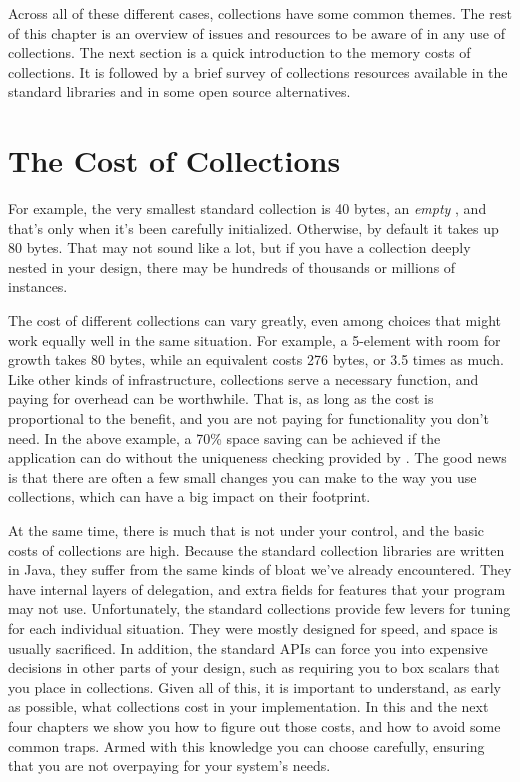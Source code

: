 Across all of these different cases, collections have some common themes.
The rest of this chapter is an overview of issues and resources to be aware of
in any use of collections. The next section is a quick
introduction to the memory costs of collections. It is followed by a brief
survey of collections resources available in the
standard libraries and in some open source alternatives.

\section{The Cost of Collections}
\label{sec:designing-with-collections}

For example,
the very smallest standard collection is 40 bytes, an \emph{empty}
, and that's only when it's been carefully initialized. 
Otherwise, by default it takes up 80 bytes. That may not sound like a lot,
but if you have a collection deeply nested in your design, there may be
hundreds of thousands or millions of instances.

The cost of different collections can vary greatly, even among choices that
might work equally well in the same situation. For example, a 5-element 
with room for growth takes 80 bytes, while an equivalent  costs 276 bytes, or 3.5 times as much. 
Like other kinds of infrastructure, collections serve a necessary
function, and paying for overhead can be worthwhile.  That is, as long as
the cost is proportional to the benefit, and you are not paying
for functionality you don't need. In the above example, a 70\% space saving
can be achieved if the application can do without the uniqueness checking
provided by .  The good news is that there are often a few small
changes you can make to the way you use collections, which can have a big
impact on their footprint.

At the same time, there is much that is not under your control, and the basic
costs of collections are high.  Because the standard collection libraries are
written in Java, they suffer from the same kinds of bloat we've already encountered. They have internal layers
of delegation, and extra fields for features that your program may not
use. Unfortunately, the standard collections provide few levers for
tuning for each individual situation. They were
mostly designed for speed, and space is usually sacrificed. In
addition, the standard APIs can force you into expensive decisions in other
parts of your design, such as requiring you to box scalars that you place in
collections. Given all of this, it is important to understand, as early as possible,
what collections cost in your implementation. In this and
the next four chapters we show you how to figure out those costs, and how
to avoid some common traps. Armed with this
knowledge you can choose carefully, ensuring that you are not
overpaying for your system's needs.
  
